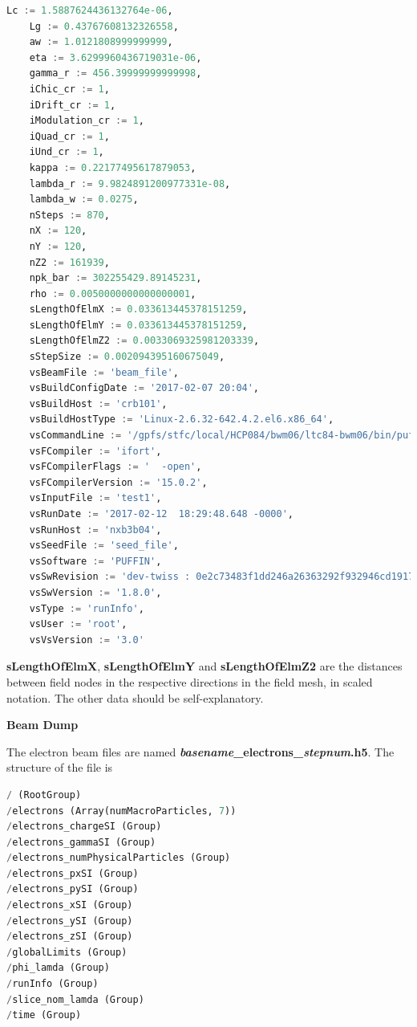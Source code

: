 \documentclass[12pt]{article}%
\begin{document}
\begin{lstlisting}[language=python]
    Lc := 1.5887624436132764e-06,
    Lg := 0.43767608132326558,
    aw := 1.0121808999999999,
    eta := 3.6299960436719031e-06,
    gamma_r := 456.39999999999998,
    iChic_cr := 1,
    iDrift_cr := 1,
    iModulation_cr := 1,
    iQuad_cr := 1,
    iUnd_cr := 1,
    kappa := 0.22177495617879053,
    lambda_r := 9.9824891200977331e-08,
    lambda_w := 0.0275,
    nSteps := 870,
    nX := 120,
    nY := 120,
    nZ2 := 161939,
    npk_bar := 302255429.89145231,
    rho := 0.0050000000000000001,
    sLengthOfElmX := 0.033613445378151259,
    sLengthOfElmY := 0.033613445378151259,
    sLengthOfElmZ2 := 0.0033069325981203339,
    sStepSize := 0.002094395160675049,
    vsBeamFile := 'beam_file',
    vsBuildConfigDate := '2017-02-07 20:04',
    vsBuildHost := 'crb101',
    vsBuildHostType := 'Linux-2.6.32-642.4.2.el6.x86_64',
    vsCommandLine := '/gpfs/stfc/local/HCP084/bwm06/ltc84-bwm06/bin/puffin-fftw3/bin/puffin test1.in',
    vsFCompiler := 'ifort',
    vsFCompilerFlags := '  -open',
    vsFCompilerVersion := '15.0.2',
    vsInputFile := 'test1',
    vsRunDate := '2017-02-12  18:29:48.648 -0000',
    vsRunHost := 'nxb3b04',
    vsSeedFile := 'seed_file',
    vsSoftware := 'PUFFIN',
    vsSwRevision := 'dev-twiss : 0e2c73483f1dd246a26363292f932946cd1917c8',
    vsSwVersion := '1.8.0',
    vsType := 'runInfo',
    vsUser := 'root',
    vsVsVersion := '3.0'
\end{lstlisting}

{\bf sLengthOfElmX}, {\bf sLengthOfElmY} and {\bf sLengthOfElmZ2} are the distances between field nodes in the respective directions in the field mesh, in scaled notation. The other data should be self-explanatory.



{\bf Beam Dump}

The electron beam files are named {\bf \textit{basename}\_electrons\_\textit{stepnum}.h5}. The structure of the file is

\begin{lstlisting}[language=python]
/ (RootGroup) 
/electrons (Array(numMacroParticles, 7)) 
/electrons_chargeSI (Group) 
/electrons_gammaSI (Group) 
/electrons_numPhysicalParticles (Group) 
/electrons_pxSI (Group) 
/electrons_pySI (Group) 
/electrons_xSI (Group) 
/electrons_ySI (Group) 
/electrons_zSI (Group) 
/globalLimits (Group) 
/phi_lamda (Group) 
/runInfo (Group) 
/slice_nom_lamda (Group) 
/time (Group) 
\end{lstlisting}
\end{document}
